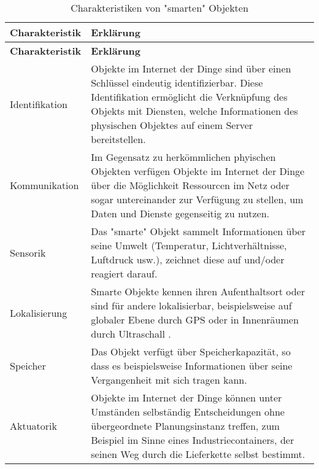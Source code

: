  \begin{longtable}{P{4.5cm}|X}
  \caption{Charakteristiken von "smarten" Objekten\cite{iotwiki}}\\
  \label{table:smartObjectsCharacteristics}
  \textbf{Charakteristik} & \textbf{Erklärung}   \\ \hline
  \endfirsthead %
  \textbf{Charakteristik} & \textbf{Erklärung}  \\ \hline
  \endhead
  Identifikation & Objekte im Internet der Dinge sind über einen Schlüssel eindeutig identifizierbar. Diese Identifikation ermöglicht die Verknüpfung des Objekts mit Diensten, welche Informationen des physischen Objektes auf einem Server bereitstellen. \\ \hline
  Kommunikation & Im Gegensatz zu herkömmlichen phyischen Objekten verfügen Objekte im Internet der Dinge über die Möglichkeit Ressourcen im Netz oder sogar untereinander zur Verfügung zu stellen, um Daten und Dienste gegenseitig zu nutzen.\\ \hline
  Sensorik & Das "smarte" Objekt sammelt Informationen über seine Umwelt (Temperatur, Lichtverhältnisse, Luftdruck usw.), zeichnet diese auf und/oder reagiert darauf.\\ \hline
  Lokalisierung & Smarte Objekte kennen ihren Aufenthaltsort oder sind für andere lokalisierbar, beispielsweise auf globaler Ebene durch GPS oder in Innenräumen durch Ultraschall .\\ \hline
  Speicher & Das Objekt verfügt über Speicherkapazität, so dass es beispielsweise Informationen über seine Vergangenheit mit sich tragen kann.\\ \hline
  Aktuatorik & Objekte im Internet der Dinge können unter Umständen selbständig Entscheidungen ohne übergeordnete Planungsinstanz treffen, zum Beispiel im Sinne eines Industriecontainers, der seinen Weg durch die Lieferkette selbst bestimmt.\\ \hline
 \end{longtable}
